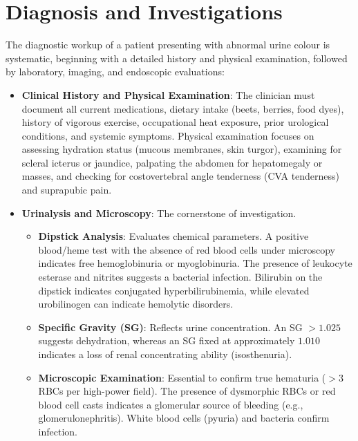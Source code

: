 \section*{Diagnosis and Investigations}
The diagnostic workup of a patient presenting with abnormal urine colour is systematic, beginning with a detailed history and physical examination, followed by laboratory, imaging, and endoscopic evaluations:

\begin{itemize}
  \item \textbf{Clinical History and Physical Examination}: The clinician must document all current medications, dietary intake (beets, berries, food dyes), history of vigorous exercise, occupational heat exposure, prior urological conditions, and systemic symptoms. Physical examination focuses on assessing hydration status (mucous membranes, skin turgor), examining for scleral icterus or jaundice, palpating the abdomen for hepatomegaly or masses, and checking for costovertebral angle tenderness (CVA tenderness) and suprapubic pain.

  \item \textbf{Urinalysis and Microscopy}: The cornerstone of investigation.
  \begin{itemize}
    \item \textbf{Dipstick Analysis}: Evaluates chemical parameters. A positive blood/heme test with the absence of red blood cells under microscopy indicates free hemoglobinuria or myoglobinuria. The presence of leukocyte esterase and nitrites suggests a bacterial infection. Bilirubin on the dipstick indicates conjugated hyperbilirubinemia, while elevated urobilinogen can indicate hemolytic disorders.
    \item \textbf{Specific Gravity (SG)}: Reflects urine concentration. An SG $>1.025$ suggests dehydration, whereas an SG fixed at approximately $1.010$ indicates a loss of renal concentrating ability (isosthenuria).
    \item \textbf{Microscopic Examination}: Essential to confirm true hematuria ($>3$ RBCs per high-power field). The presence of dysmorphic RBCs or red blood cell casts indicates a glomerular source of bleeding (e.g., glomerulonephritis). White blood cells (pyuria) and bacteria confirm infection.
  \end{itemize}


\end{itemize}
